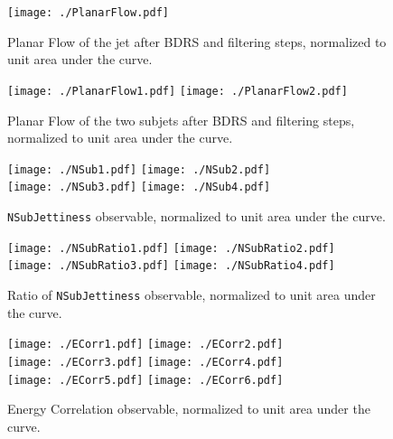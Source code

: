 \begin{figure}
    \begin{center}
        \texttt{[image: ./PlanarFlow.pdf]}
        \caption{ Planar Flow of the jet after BDRS and filtering steps, normalized to unit area under the curve. }
        \label{fig:PlanarFlow}
    \end{center}
\end{figure}

\begin{figure}
    \begin{center}
        \texttt{[image: ./PlanarFlow1.pdf]}
        \texttt{[image: ./PlanarFlow2.pdf]}\\
        \caption{ Planar Flow of the two subjets after BDRS and filtering steps, normalized to unit area under the curve. }
        \label{fig:PlanarFlowX}
    \end{center}
\end{figure}

\begin{figure}
    \begin{center}
        \texttt{[image: ./NSub1.pdf]}
        \texttt{[image: ./NSub2.pdf]}\\
        \texttt{[image: ./NSub3.pdf]}
        \texttt{[image: ./NSub4.pdf]}\\
        \caption{ {\tt NSubJettiness} observable, normalized to unit area under the curve. }
        \label{fig:NSub}
    \end{center}
\end{figure}

\begin{figure}
    \begin{center}
        \texttt{[image: ./NSubRatio1.pdf]}
        \texttt{[image: ./NSubRatio2.pdf]}\\
        \texttt{[image: ./NSubRatio3.pdf]}
        \texttt{[image: ./NSubRatio4.pdf]}\\
        \caption{ Ratio of {\tt NSubJettiness} observable, normalized to unit area under the curve. }
        \label{fig:NSubRatio}
    \end{center}
\end{figure}

\begin{figure}
    \begin{center}
        \texttt{[image: ./ECorr1.pdf]}
        \texttt{[image: ./ECorr2.pdf]}\\
        \texttt{[image: ./ECorr3.pdf]}
        \texttt{[image: ./ECorr4.pdf]}\\
        \texttt{[image: ./ECorr5.pdf]}
        \texttt{[image: ./ECorr6.pdf]}\\
        \caption{ Energy Correlation observable, normalized to unit area under the curve. }
        \label{fig:ECorr}
    \end{center}
\end{figure}

